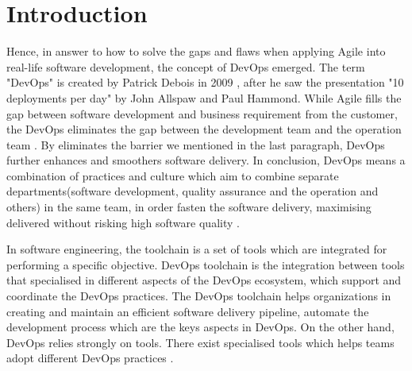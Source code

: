 \chapter{Introduction}
\label{chp:introduction}
\par
Hence, in answer to how to solve the gaps and flaws when applying Agile into real-life software development, the concept of DevOps emerged. The term "DevOps" is created by Patrick Debois in 2009 \cite{kim2016devops}, after he saw the presentation "10 deployments per day" by John Allspaw and Paul Hammond. While Agile fills the gap between software development and business requirement from the customer, the DevOps eliminates the gap between the development team and the operation team \cite{WhatisaD20:online}. By eliminates the barrier we mentioned in the last paragraph, DevOps further enhances and smoothers software delivery. In conclusion, DevOps means a combination of practices and culture which aim to combine separate departments(software development, quality assurance and the operation and others) in the same team, in order fasten the software delivery, maximising delivered without risking high software quality \cite{DevOpsWi87:online}\cite{ebert2016devops}.
\par
In software engineering, the toolchain is a set of tools which are integrated for performing a specific objective. DevOps toolchain is the integration between tools that specialised in different aspects of the DevOps ecosystem, which support and coordinate the DevOps practices. The DevOps toolchain helps organizations in creating and maintain an efficient software delivery pipeline, automate the development process \cite{DevOpsto7:online} which are the keys aspects in DevOps. On the other hand, DevOps relies strongly on tools. There exist specialised tools which helps teams adopt different DevOps practices \cite{zhu2016devops}. 

